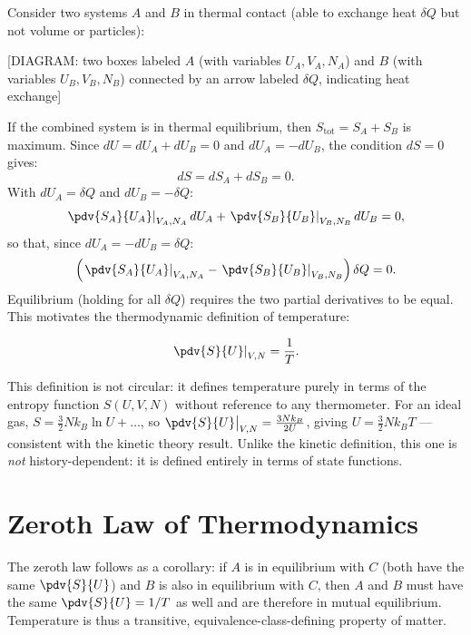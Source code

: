 Consider two systems $A$ and $B$ in thermal contact (able to exchange heat $\delta Q$ but not volume or particles):

\begin{center}[DIAGRAM: two boxes labeled $A$ (with variables $U_A, V_A, N_A$) and $B$ (with variables $U_B, V_B, N_B$) connected by an arrow labeled $\delta Q$, indicating heat exchange]\end{center}

If the combined system is in thermal equilibrium, then $S_{\text{tot}} = S_A + S_B$ is maximum. Since $dU = dU_A + dU_B = 0$ and $dU_A = -dU_B$, the condition $dS = 0$ gives:
\begin{equation}
    dS = dS_A + dS_B = 0.
\end{equation}
With $dU_A = \delta Q$ and $dU_B = -\delta Q$:
\begin{equation}
    \left.\pdv{S_A}{U_A}\right|_{V_A,N_A} dU_A + \left.\pdv{S_B}{U_B}\right|_{V_B,N_B} dU_B = 0,
\end{equation}
so that, since $dU_A = -dU_B = \delta Q$:
\begin{equation}
    \left(\left.\pdv{S_A}{U_A}\right|_{V_A,N_A} - \left.\pdv{S_B}{U_B}\right|_{V_B,N_B}\right)\delta Q = 0.
\end{equation}
Equilibrium (holding for all $\delta Q$) requires the two partial derivatives to be equal. This motivates the thermodynamic definition of temperature:

\begin{theorem}
\begin{equation}
    \left.\pdv{S}{U}\right|_{V,N} = \frac{1}{T}.
\end{equation}
\end{theorem}

This definition is not circular: it defines temperature purely in terms of the entropy function $S(U,V,N)$ without reference to any thermometer. For an ideal gas, $S = \frac{3}{2}Nk_B\ln U + \ldots$, so $\pdv{S}{U}\big|_{V,N} = \frac{3Nk_B}{2U}$, giving $U = \frac{3}{2}Nk_BT$ — consistent with the kinetic theory result. Unlike the kinetic definition, this one is \emph{not} history-dependent: it is defined entirely in terms of state functions.

\section{Zeroth Law of Thermodynamics}

The zeroth law follows as a corollary: if $A$ is in equilibrium with $C$ (both have the same $\pdv{S}{U}$) and $B$ is also in equilibrium with $C$, then $A$ and $B$ must have the same $\pdv{S}{U} = 1/T$ as well and are therefore in mutual equilibrium. Temperature is thus a transitive, equivalence-class-defining property of matter.
